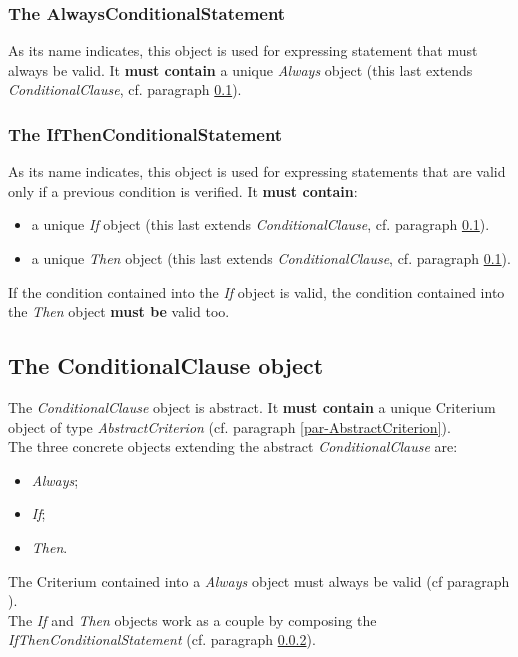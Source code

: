 \documentclass[a4paper,11pt] {article}
\begin{document}
\subsubsection{The AlwaysConditionalStatement}\label{par-AlwaysConditionalStatement}
As its name indicates, this object is used for expressing statement that must always be valid. It {\bf must contain} a unique {\it Always} object (this last extends {\it ConditionalClause}, cf. paragraph \ref{par-ConditionalClause}).

\subsubsection{The IfThenConditionalStatement}\label{par-IfThenConditionalStatement}
As its name indicates, this object is used for expressing statements that are valid only if a previous condition is verified. It {\bf must contain}:
\begin{itemize}
\item a unique {\it If} object (this last extends {\it ConditionalClause}, cf. paragraph \ref{par-ConditionalClause}).
\item a unique {\it Then} object (this last extends {\it ConditionalClause}, cf. paragraph \ref{par-ConditionalClause}).
\end{itemize}
If the condition contained into the {\it If} object is valid, the condition contained into the {\it Then} object {\bf must be} valid too.

\subsection{The ConditionalClause object}\label{par-ConditionalClause}
The {\it ConditionalClause} object is abstract. It {\bf must contain} a unique Criterium object of type {\it AbstractCriterion} (cf. paragraph \ref{par-AbstractCriterion}).\\
The three concrete objects extending the abstract {\it ConditionalClause} are:
\begin{itemize}
\item {\it Always};
\item {\it If};
\item {\it Then}.
\end{itemize}
The Criterium contained into a {\it Always} object must always be valid (cf paragraph \label{par-AlwaysConditionalStatement}).\\
The {\it If} and {\it Then} objects work as a couple by composing the  {\it IfThenConditionalStatement} (cf. paragraph 
\ref{par-IfThenConditionalStatement}).
\end{document}
